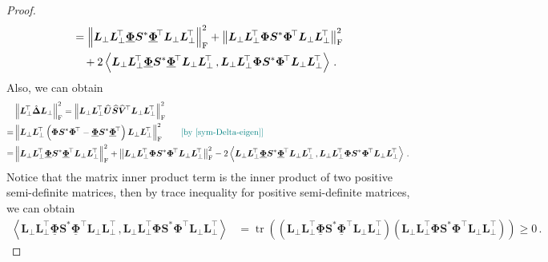 \begin{proof}
\begin{align*}
    & = \left\|\bm L_\perp \bm L_\perp^{\!\top} \underline{\bm \Phi} \bm S^* \underline{\bm \Phi}^{\!\top}\bm L_\perp \bm L_\perp^{\!\top}\right\|^2_{\rm F} + \left\|\bm L_\perp \bm L_\perp^{\!\top} \bm \Phi \bm S^* \bm \Phi^{\!\top}\bm L_\perp \bm L_\perp^{\!\top}\right\|^2_{\rm F}\\
    &\quad+2\left\langle \bm L_\perp \bm L_\perp^{\!\top} \underline{\bm \Phi} \bm S^* \underline{\bm \Phi}^{\!\top}\bm L_\perp \bm L_\perp^{\!\top}\,,\bm L_\perp \bm L_\perp^{\!\top} \bm \Phi \bm S^* \bm \Phi^{\!\top}\bm L_\perp \bm L_\perp^{\!\top}\right\rangle\,.
\end{align*}
Also, we can obtain
\begin{align*}
    & \left\|\bm L_\perp^{\!\top}\hat{\bm \Delta}\bm L_\perp\right\|^2_{\rm F} = \left\|\bm L_\perp \bm L_\perp^{\!\top} \widehat{\bm U}\widehat{\bm S}\widehat{\bm V}^{\!\top}\bm L_\perp \bm L_\perp^{\!\top}\right\|^2_{\rm F}\\
    = & \left\|\bm L_\perp \bm L_\perp^{\!\top} \left(\bm \Phi \bm S^* \bm \Phi^{\!\top} - \underline{\bm \Phi} \bm S^* \underline{\bm \Phi}^{\!\top}\right)\bm L_\perp \bm L_\perp^{\!\top}\right\|^2_{\rm F} \tag*{\color{teal}[by \cref{sym-Delta-eigen}]}\\
    = & \left\|\bm L_\perp \bm L_\perp^{\!\top} \underline{\bm \Phi} \bm S^* \underline{\bm \Phi}^{\!\top}\bm L_\perp \bm L_\perp^{\!\top}\right\|^2_{\rm F} + \left\|\bm L_\perp \bm L_\perp^{\!\top} \bm \Phi \bm S^* \bm \Phi^{\!\top}\bm L_\perp \bm L_\perp^{\!\top}\right\|^2_{\rm F}
    -2\left\langle \bm L_\perp \bm L_\perp^{\!\top} \underline{\bm \Phi} \bm S^* \underline{\bm \Phi}^{\!\top}\bm L_\perp \bm L_\perp^{\!\top}\,,\bm L_\perp \bm L_\perp^{\!\top} \bm \Phi \bm S^* \bm \Phi^{\!\top}\bm L_\perp \bm L_\perp^{\!\top}\right\rangle\,.
\end{align*}
Notice that the matrix inner product term is the inner product of two positive semi-definite matrices, then by trace inequality for positive semi-definite matrices, we can obtain
\begin{align*}
    \left\langle \bm L_\perp \bm L_\perp^{\!\top} \underline{\bm \Phi} \bm S^* \underline{\bm \Phi}^{\!\top}\bm L_\perp \bm L_\perp^{\!\top}\,,\bm L_\perp \bm L_\perp^{\!\top} \bm \Phi \bm S^* \bm \Phi^{\!\top}\bm L_\perp \bm L_\perp^{\!\top}\right\rangle & = \operatorname{tr}\left(\left(\bm L_\perp \bm L_\perp^{\!\top} \underline{\bm \Phi} \bm S^* \underline{\bm \Phi}^{\!\top}\bm L_\perp \bm L_\perp^{\!\top}\right)\left(\bm L_\perp \bm L_\perp^{\!\top} \bm \Phi \bm S^* \bm \Phi^{\!\top}\bm L_\perp \bm L_\perp^{\!\top}\right)\right)\geq 0\,.

\end{align*}
\end{proof}
